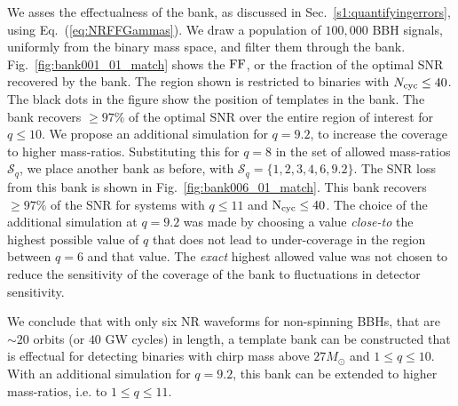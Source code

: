 
We asses the effectualness of the bank, as discussed in 
Sec.~\ref{s1:quantifyingerrors}, using Eq.~(\ref{eq:NRFFGammas}).
We draw a population of $100,000$ BBH signals, uniformly from the binary 
mass space, and filter them through the bank. Fig.~\ref{fig:bank001_01_match}
shows the $\mathrm{FF}$, or the fraction of the optimal SNR recovered by the bank. 
The region shown is restricted to binaries with $N_{\mathrm{cyc}}\leq 40$.
The black dots in the figure show the position of templates in the bank. 
The bank recovers $\geq 97\%$ of the optimal SNR over the entire region 
of interest for $q\leq 10$. We 
propose an additional simulation for $q=9.2$, to increase the coverage to
higher mass-ratios. Substituting this for $q=8$ in the set of allowed 
mass-ratios $\mathcal{S}_q$, we place another bank as before, with
$\mathcal{S}_q=\{1,2,3,4,6,9.2\}$. The SNR loss from this bank is shown in
Fig.~\ref{fig:bank006_01_match}. This bank recovers $\geq 97\%$ of the SNR for
systems with $q\leq 11$ and $\mathrm{N}_{\mathrm{cyc}}\leq 40$. The choice of the additional
simulation at $q=9.2$ was made by choosing a value \textit{close-to} the 
highest possible value of $q$ that does not lead to under-coverage in the 
region between $q=6$ and that value. The \textit{exact} highest allowed 
value was not chosen to reduce the sensitivity of the coverage of the bank
to fluctuations in detector sensitivity.

We conclude that with only six NR waveforms for non-spinning BBHs, that are
$\sim 20$ orbits (or $40$ GW cycles) in length, a template bank can be
constructed that is effectual for detecting binaries with chirp mass above
$27M_\odot$ and $1\leq q\leq 10$. With an additional 
simulation for $q=9.2$, this bank can 
be extended to higher mass-ratios, i.e. to $1\leq q\leq 11$.

